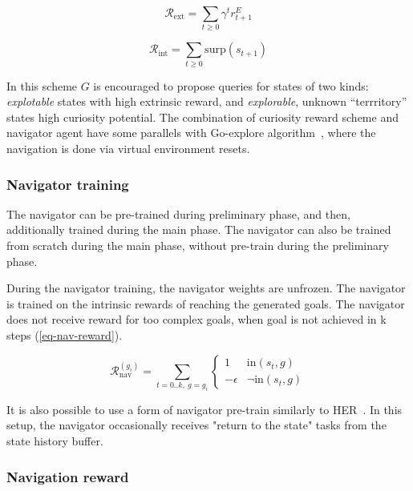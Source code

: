 \documentclass[acmsmall, nonacm]{acmart}
\begin{document}
\begin{equation} \label{eq-gs-est-reward}
\mathcal{R}_\mathrm{ext} = 
\sum_{t \geq 0} \gamma^t r^E_{t+1}
\end{equation}

\begin{equation} \label{eq-gs-int-reward}
\mathcal{R}_\mathrm{int} = 
\sum_{t \ge 0}  \mathrm{surp}(s_{t+1})
\end{equation}

In this scheme $G$ is encouraged to propose queries for states of two kinds: \emph{explotable} states with high extrinsic reward, and \emph{explorable}, unknown ``terrritory'' states high curiosity potential.
%
The combination of curiosity reward scheme and navigator agent have some parallels with Go-explore algorithm~\citep{ecoffet_first_2021}, where the navigation is done via virtual environment resets.

\subsubsection{Navigator training}

The navigator can be pre-trained during preliminary phase, and then, additionally trained during the main phase. The navigator can also be trained from scratch during the main phase, without pre-train during the preliminary phase.

During the navigator training, the navigator weights are unfrozen. The navigator is trained on the intrinsic rewards of reaching the generated goals. The navigator does not receive reward for too complex goals, when goal is not achieved in k steps (\ref{eq-nav-reward}).

\begin{equation} \label{eq-nav-reward}
\mathcal{R}_\mathrm{nav}^{(g_i)}= \sum_{t=0..k,\ g=g_i}
\begin{cases}
1 & \mathrm{in}(s_t, g) \\
-\epsilon & \lnot \mathrm{in}(s_t, g)
\end{cases}
\end{equation}

It is also possible to use a form of navigator pre-train similarly to HER~\citep{andrychowicz_hindsight_2017}. In this setup, the navigator occasionally receives "return to the state" tasks from the state history buffer.

\subsubsection{Navigation reward}
\label{ssub:navigation_reward}
\end{document}

